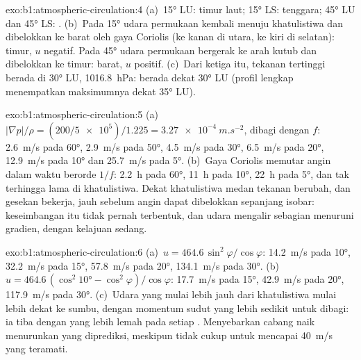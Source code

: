 \begin{solution}{exo:b1:atmospheric-circulation:4}
(a)~\ang{15} LU:  timur laut; \ang{15} LS:  tenggara;
\ang{45} LU dan \ang{45} LS: . (b)~Pada \ang{15} udara permukaan  kembali
menuju khatulistiwa dan dibelokkan ke barat oleh gaya Coriolis (ke kanan di utara, ke kiri di selatan): timur, $u$ negatif.
Pada \ang{45} udara permukaan  bergerak ke arah kutub dan dibelokkan ke timur: barat,
$u$ positif. (c)~Dari ketiga  itu, tekanan tertinggi berada di \ang{30} LU,
\qty{1016.8}{hPa}:  berada dekat \ang{30} LU (profil lengkap menempatkan
maksimumnya dekat \ang{35} LU).
\end{solution}

\begin{solution}{exo:b1:atmospheric-circulation:5}
(a)~$|\nabla p|/\rho = (200/\num{5e5})/1.225 = \qty{3.27e-4}{m.s^{-2}}$, dibagi dengan
$f$: \qty{2.6}{m/s} pada \ang{60}, \qty{2.9}{m/s} pada \ang{50}, \qty{4.5}{m/s} pada
\ang{30}, \qty{6.5}{m/s} pada \ang{20}, \qty{12.9}{m/s} pada \ang{10} dan
\qty{25.7}{m/s} pada \ang{5}. (b)~Gaya Coriolis memutar angin dalam waktu berorde
$1/f$: \qty{2.2}{h} pada \ang{60}, \qty{11}{h} pada \ang{10}, \qty{22}{h} pada \ang{5}, dan
tak terhingga lama di khatulistiwa. Dekat khatulistiwa medan tekanan berubah, dan gesekan bekerja,
jauh sebelum angin dapat dibelokkan sepanjang isobar: keseimbangan itu tidak pernah terbentuk, dan udara mengalir sebagian menuruni gradien, dengan kelajuan sedang.
\end{solution}

\begin{solution}{exo:b1:atmospheric-circulation:6}
(a)~$u = 464.6\,\sin^2\varphi/\cos\varphi$: \qty{14.2}{m/s} pada \ang{10},
\qty{32.2}{m/s} pada \ang{15}, \qty{57.8}{m/s} pada \ang{20}, \qty{134.1}{m/s} pada
\ang{30}. (b)~$u = 464.6\,(\cos^2\ang{10} - \cos^2\varphi)/\cos\varphi$:
\qty{17.7}{m/s} pada \ang{15}, \qty{42.9}{m/s} pada \ang{20}, \qty{117.9}{m/s} pada
\ang{30}. (c)~Udara yang mulai lebih jauh dari khatulistiwa mulai lebih dekat ke sumbu,
dengan momentum sudut yang lebih sedikit untuk dibagi: ia tiba dengan  yang lebih lemah pada setiap
. Menyebarkan cabang naik menurunkan  yang diprediksi, meskipun tidak cukup
untuk mencapai \qty{40}{m/s} yang teramati.
\end{solution}

